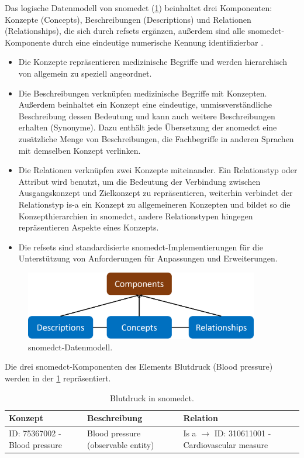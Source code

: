 Das logische Datenmodell von \ac{snomedct} (\ref{fig:snomedmodel}) beinhaltet drei Komponenten: Konzepte (Concepts), Beschreibungen (Descriptions) und Relationen (Relationships), die sich durch \ac{refsets} ergänzen, außerdem sind alle \ac{snomedct}-Komponente durch eine eindeutige numerische Kennung identifizierbar \cite{snomedguide}. 
\begin{itemize}
	\item Die Konzepte repräsentieren medizinische Begriffe und werden hierarchisch von allgemein zu speziell angeordnet.
	\item Die Beschreibungen verknüpfen medizinische Begriffe mit Konzepten. Außerdem beinhaltet ein Konzept eine eindeutige, unmissverständliche Beschreibung dessen Bedeutung und kann auch weitere Beschreibungen erhalten (Synonyme). Dazu enthält jede Übersetzung der \ac{snomedct} eine zusätzliche Menge von Beschreibungen, die Fachbegriffe in anderen Sprachen mit demselben Konzept verlinken.
	\item Die Relationen verknüpfen zwei Konzepte miteinander. Ein Relationstyp oder Attribut wird benutzt, um die Bedeutung der Verbindung zwischen Ausgangskonzept und Zielkonzept zu repräsentieren, weiterhin verbindet der Relationstyp \glqq is-a\grqq{} ein Konzept zu allgemeineren Konzepten und bildet so die Konzepthierarchien in \ac{snomedct}, andere Relationstypen hingegen repräsentieren Aspekte eines Konzepts.
	\item Die \ac{refsets} sind standardisierte \ac{snomedct}-Implementierungen für die Unterstützung von Anforderungen für Anpassungen und Erweiterungen.
\end{itemize}

\begin{figure}[ht]
	\centering
	\includegraphics[height=3cm]{figures/snomedmodel}
	\caption[\acs{snomedct}-Datenmodell]{\acs{snomedct}-Datenmodell.}
	\label{fig:snomedmodel}
\end{figure}

Die drei \ac{snomedct}-Komponenten des Elements Blutdruck (Blood pressure) werden in der \ref{tab:snomedexample} repräsentiert.

\begin{table}[ht]
	\centering 
	\small 
	\caption[Blutdruck in \acs{snomedct}]{Blutdruck in \acs{snomedct}.}
	\label{tab:snomedexample}
	\begin{tabular}{|p{2.5cm}|p{3.2cm}|p{5.3cm}|}
		\hline 
		 \bfseries Konzept & \bfseries Beschreibung & \bfseries Relation \\ \hline 
		ID: 75367002 - Blood pressure & Blood pressure (observable entity) &  Is a  $\to$  ID: 310611001 - Cardiovascular measure \\ \hline		    
	\end{tabular}
\end{table}

